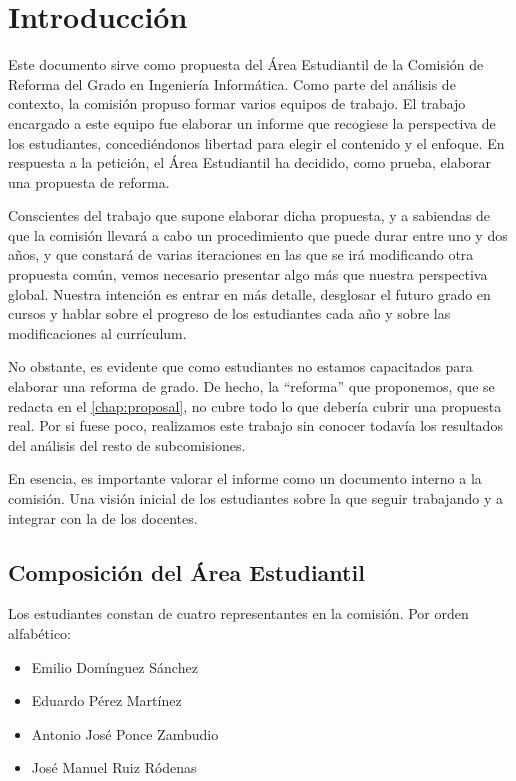 \chapter{Introducción}

Este documento sirve como propuesta del Área Estudiantil de
la Comisión de Reforma del Grado en Ingeniería Informática.
Como parte del análisis de contexto,
la comisión propuso formar varios equipos de trabajo.
El trabajo encargado a este equipo fue elaborar un informe
que recogiese la perspectiva de los estudiantes,
concediéndonos libertad para elegir el contenido y el enfoque.
En respuesta a la petición,
el Área Estudiantil ha decidido, como prueba, elaborar una propuesta de reforma.

Conscientes del trabajo que supone elaborar dicha propuesta,
y a sabiendas de que la comisión llevará a cabo un procedimiento
que puede durar entre uno y dos años,
y que constará de varias iteraciones en las que
se irá modificando otra propuesta común,
vemos necesario presentar algo más que nuestra perspectiva global.
Nuestra intención es entrar en más detalle,
desglosar el futuro grado en cursos y
hablar sobre el progreso de los estudiantes cada año y
sobre las modificaciones al currículum.

No obstante, es evidente que como estudiantes
no estamos capacitados para elaborar una reforma de grado.
De hecho, la ``reforma'' que proponemos,
que se redacta en el \cref{chap:proposal},
no cubre todo lo que debería cubrir una propuesta real.
Por si fuese poco, realizamos este trabajo sin conocer todavía
los resultados del análisis del resto de subcomisiones.

En esencia, es importante valorar el informe como
un documento interno a la comisión.
Una visión inicial de los estudiantes
sobre la que seguir trabajando y
a integrar con la de los docentes.

\section{Composición del Área Estudiantil}

Los estudiantes constan de cuatro representantes en la comisión.
Por orden alfabético:
\begin{itemize}
    \item Emilio Domínguez Sánchez
    \item Eduardo Pérez Martínez
    \item Antonio José Ponce Zambudio
    \item José Manuel Ruiz Ródenas
\end{itemize}

